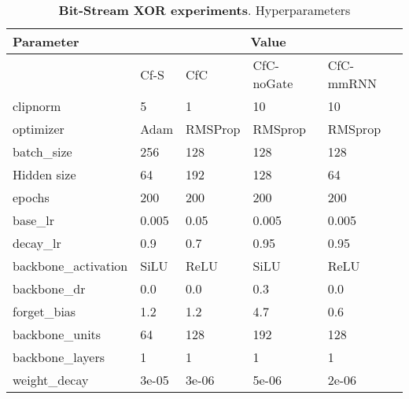 \documentclass[12pt]{article}
\begin{document}
\begin{table}[t]
    \centering
    \caption{\textbf{Bit-Stream XOR experiments}. Hyperparameters}
\begin{tabular}{lllll}
\toprule
Parameter & \multicolumn{4}{c}{Value}  \\
\midrule
{} & Cf-S & CfC & CfC-noGate & CfC-mmRNN \\
\midrule
clipnorm & 5 & 1 & 10 & 10 \\ 
optimizer & Adam & RMSProp & RMSprop & RMSprop \\
batch\_size & 256 & 128 & 128 & 128\\
Hidden size & 64 & 192 & 128 & 64 \\
epochs      & 200 & 200 & 200 & 200 \\ 
   base\_lr & 0.005 & 0.05 & 0.005 & 0.005\\
   decay\_lr & 0.9 & 0.7 & 0.95 & 0.95 \\ 
   backbone\_activation & SiLU & ReLU & SiLU & ReLU \\ 
   backbone\_dr & 0.0 & 0.0 & 0.3 & 0.0 \\
   forget\_bias & 1.2 & 1.2 & 4.7 & 0.6 \\
   backbone\_units & 64 & 128 & 192 & 128 \\
   backbone\_layers & 1 & 1 & 1 & 1 \\
   weight\_decay & 3e-05 & 3e-06 & 5e-06 & 2e-06 \\ 
\bottomrule
\end{tabular}
    \label{tab:hyperparamsxor}
\end{table}
\end{document}
